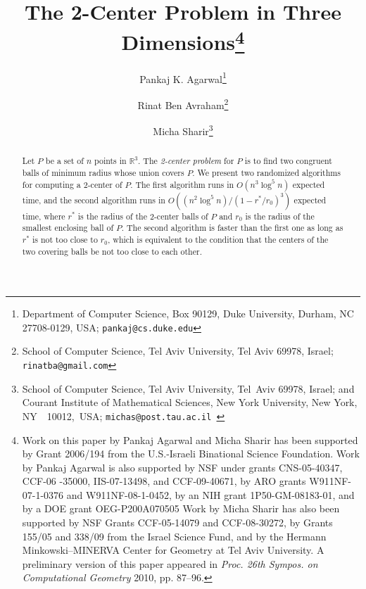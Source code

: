 \documentclass[a4paper,12pt]{article}
\def\reals{\mathbb{R}}
\begin{document}
\begin{titlepage}

\title{The 2-Center Problem in Three Dimensions{\large{\thanks{Work on this paper by Pankaj Agarwal and Micha Sharir has been
supported by Grant 2006/194 from the U.S.-Israeli Binational Science
Foundation. Work by Pankaj Agarwal is also supported by NSF under
grants
 CNS-05-40347, CCF-06 -35000, IIS-07-13498,
                and CCF-09-40671, by ARO grants
                W911NF-07-1-0376 and W911NF-08-1-0452, by an
                NIH grant 1P50-GM-08183-01, and by a DOE grant
                OEG-P200A070505
Work by Micha Sharir has also been supported
by NSF Grants CCF-05-14079 and CCF-08-30272,
by Grants 155/05 and 338/09 from the Israel Science Fund,
and by the Hermann Minkowski--MINERVA Center for Geometry at Tel Aviv
University. A preliminary version of this paper appeared in {\it Proc. 26th Sympos. on Computational Geometry} 2010, pp. 87--96.
  }}}}





\author{
  Pankaj K. Agarwal\thanks{Department of Computer Science, Box 90129, Duke University,
      Durham, NC 27708-0129, USA; {\tt pankaj@cs.duke.edu}}
       \and
       Rinat Ben Avraham\thanks{School of Computer Science, Tel Aviv University, Tel Aviv 69978,
          Israel; {\tt rinatba@gmail.com}}
       \and
       Micha Sharir\thanks{School of Computer Science, Tel Aviv University, Tel~Aviv 69978,
          Israel; and Courant Institute of Mathematical Sciences, New York
          University, New York, NY~~10012,~USA; {\tt michas@post.tau.ac.il }}
 }
\date{}
\maketitle

\begin{abstract}
Let $P$ be a set of $n$ points in $\reals^3$.  The \emph{2-center
problem} for $P$ is to find two congruent balls of minimum radius
whose union covers $P$. We present two randomized algorithms for
computing a 2-center of $P$. The first  algorithm runs in
$O(n^3\log^5 n)$ expected time, and the second algorithm runs in
$O((n^2 \log^5 n) /(1-r^*/r_0)^3)$ expected time, where $r^*$ is the
radius of the 2-center balls of $P$ and $r_0$ is the radius of the
smallest enclosing ball of $P$. The second algorithm is faster than
the first one as long as $r^*$ is not too close to $r_0$, which is
equivalent to the condition that the centers of the two covering
balls be not too close to each other.
\end{abstract}

\end{titlepage}
\end{document}
